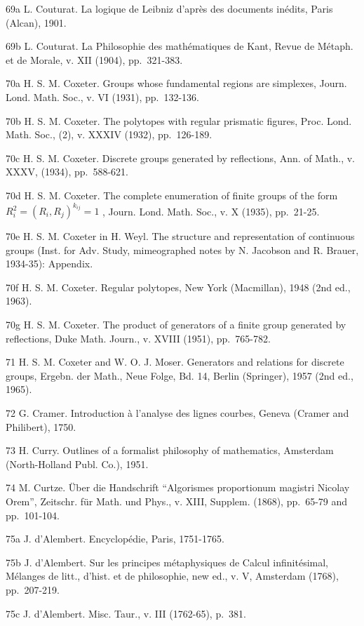 69a L. Couturat. La logique de Leibniz d'après des documents inédits, Paris (Alcan), 1901.

69b L. Couturat. La Philosophie des mathématiques de Kant, Revue de Métaph. et de Morale, v. XII (1904), pp.~321-383.

70a H. S. M. Coxeter. Groups whose fundamental regions are simplexes, Journ. Lond. Math. Soc., v. VI (1931), pp.~132-136.

70b H. S. M. Coxeter. The polytopes with regular prismatic figures, Proc. Lond. Math. Soc., (2), v. XXXIV (1932), pp.~126-189.

70c H. S. M. Coxeter. Discrete groups generated by reflections, Ann. of Math., v. XXXV, (1934), pp.~588-621.

70d H. S. M. Coxeter. The complete enumeration of finite groups of the form \(R_{i}^{2} = (R_{i}, R_{j})^{k_{ij}} = 1\) , Journ. Lond. Math. Soc., v. X (1935), pp.~21-25.

70e H. S. M. Coxeter in H. Weyl. The structure and representation of continuous groups (Inst. for Adv. Study, mimeographed notes by N. Jacobson and R. Brauer, 1934-35): Appendix.

70f H. S. M. Coxeter. Regular polytopes, New York (Macmillan), 1948 (2nd ed., 1963).

70g H. S. M. Coxeter. The product of generators of a finite group generated by reflections, Duke Math. Journ., v. XVIII (1951), pp.~765-782.

71 H. S. M. Coxeter and W. O. J. Moser. Generators and relations for discrete groups, Ergebn. der Math., Neue Folge, Bd. 14, Berlin (Springer), 1957 (2nd ed., 1965).

72 G. Cramer. Introduction à l'analyse des lignes courbes, Geneva (Cramer and Philibert), 1750.

73 H. Curry. Outlines of a formalist philosophy of mathematics, Amsterdam (North-Holland Publ. Co.), 1951.

74 M. Curtze. Über die Handschrift ``Algorismes proportionum magistri Nicolay Orem'', Zeitschr. für Math. und Phys., v. XIII, Supplem. (1868), pp.~65-79 and pp.~101-104.

75a J. d'Alembert. Encyclopédie, Paris, 1751-1765.

75b J. d'Alembert. Sur les principes métaphysiques de Calcul infinitésimal, Mélanges de litt., d'hist. et de philosophie, new ed., v. V, Amsterdam (1768), pp.~207-219.

75c J. d'Alembert. Misc. Taur., v. III (1762-65), p.~381.

